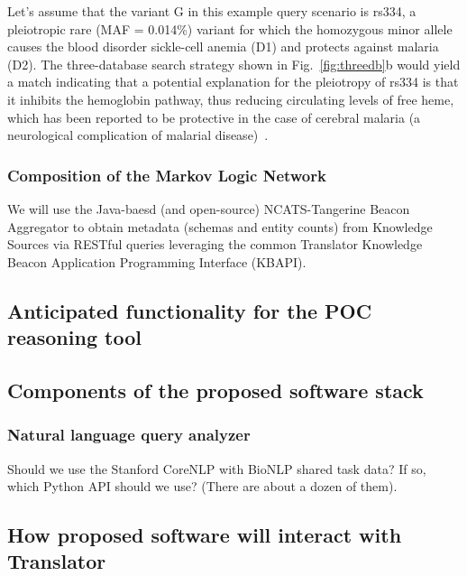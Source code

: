 \documentclass[11pt,notitlepage]{article}
\begin{document}
Let's assume that the variant G in this example query scenario is rs334, a
pleiotropic rare (MAF = 0.014\%) variant for which the homozygous minor allele
causes the blood disorder sickle-cell anemia (D1) and protects against malaria
(D2). The three-database search strategy shown in Fig.~\ref{fig:threedb}b would
yield a match indicating that a potential explanation for the pleiotropy of
rs334 is that it inhibits the hemoglobin pathway, thus reducing circulating
levels of free heme, which has been reported to be protective in the case of
cerebral malaria (a neurological complication of malarial
disease)~\cite{Ferreira:2011ff}.

\subsubsection{Composition of the Markov Logic Network}
We will use the Java-baesd (and open-source) NCATS-Tangerine Beacon Aggregator
to obtain metadata (schemas and entity counts) from Knowledge Sources via
RESTful queries leveraging the common Translator Knowledge Beacon Application
Programming Interface (KBAPI).


\subsection{Anticipated functionality for the POC reasoning tool}
\subsection{Components of the proposed software stack}

\subsubsection{Natural language query analyzer}
\label{sec:nlp}
Should we use the Stanford CoreNLP with BioNLP shared task data? If so, which
Python API should we use? (There are about a dozen of them).

\subsection{How proposed software will interact with Translator}
\end{document}
